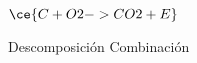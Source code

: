 $\ce{C + O2 -> CO2 + E}$

\begin{oneparchoices}
    \choice Descomposición
    \choice Combinación
\end{oneparchoices}